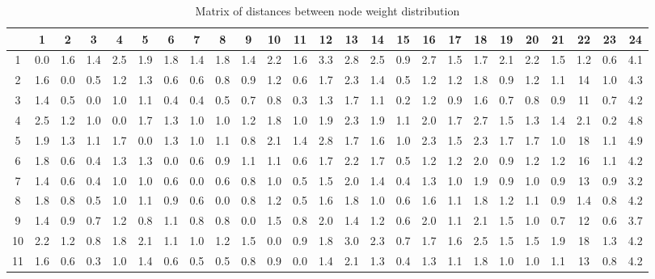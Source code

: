\begin{table}[htbp]
\footnotesize
\setlength{\tabcolsep}{3pt}
\caption{Matrix of distances between node weight distribution}
\label{Table:SpaceDistance}
\centering
\begin{tabular}{c|cccccccccccccccccccccccc}
\hline
& 1 & 2 & 3 & 4 & 5 & 6 & 7 & 8 & 9 & 10 & 11 & 12 & 13 & 14 & 15 & 16 & 17 & 18 & 19 & 20 & 21 & 22 & 23 & 24 \\
\hline
1 & 0.0 & 1.6 & 1.4 & 2.5 & 1.9 & 1.8 & 1.4 & 1.8 & 1.4 & 2.2 & 1.6 & 3.3 & 2.8 & 2.5 & 0.9 & 2.7 & 1.5 & 1.7 & 2.1 & 2.2 & 1.5 & 1.2 & 0.6 & 4.1 \\
2 & 1.6 & 0.0 & 0.5 & 1.2 & 1.3 & 0.6 & 0.6 & 0.8 & 0.9 & 1.2 & 0.6 & 1.7 & 2.3 & 1.4 & 0.5 & 1.2 & 1.2 & 1.8 & 0.9 & 1.2 & 1.1 & 14 & 1.0 & 4.3 \\
3 & 1.4 & 0.5 & 0.0 & 1.0 & 1.1 & 0.4 & 0.4 & 0.5 & 0.7 & 0.8 & 0.3 & 1.3 & 1.7 & 1.1 & 0.2 & 1.2 & 0.9 & 1.6 & 0.7 & 0.8 & 0.9 & 11 & 0.7 & 4.2 \\
4 & 2.5 & 1.2 & 1.0 & 0.0 & 1.7 & 1.3 & 1.0 & 1.0 & 1.2 & 1.8 & 1.0 & 1.9 & 2.3 & 1.9 & 1.1 & 2.0 & 1.7 & 2.7 & 1.5 & 1.3 & 1.4 & 2.1 & 0.2 & 4.8 \\
5 & 1.9 & 1.3 & 1.1 & 1.7 & 0.0 & 1.3 & 1.0 & 1.1 & 0.8 & 2.1 & 1.4 & 2.8 & 1.7 & 1.6 & 1.0 & 2.3 & 1.5 & 2.3 & 1.7 & 1.7 & 1.0 & 18 & 1.1 & 4.9 \\
6 & 1.8 & 0.6 & 0.4 & 1.3 & 1.3 & 0.0 & 0.6 & 0.9 & 1.1 & 1.1 & 0.6 & 1.7 & 2.2 & 1.7 & 0.5 & 1.2 & 1.2 & 2.0 & 0.9 & 1.2 & 1.2 & 16 & 1.1 & 4.2 \\
7 & 1.4 & 0.6 & 0.4 & 1.0 & 1.0 & 0.6 & 0.0 & 0.6 & 0.8 & 1.0 & 0.5 & 1.5 & 2.0 & 1.4 & 0.4 & 1.3 & 1.0 & 1.9 & 0.9 & 1.0 & 0.9 & 13 & 0.9 & 3.2 \\
8 & 1.8 & 0.8 & 0.5 & 1.0 & 1.1 & 0.9 & 0.6 & 0.0 & 0.8 & 1.2 & 0.5 & 1.6 & 1.8 & 1.0 & 0.6 & 1.6 & 1.1 & 1.8 & 1.2 & 1.1 & 0.9 & 1.4 & 0.8 & 4.2 \\
9 & 1.4 & 0.9 & 0.7 & 1.2 & 0.8 & 1.1 & 0.8 & 0.8 & 0.0 & 1.5 & 0.8 & 2.0 & 1.4 & 1.2 & 0.6 & 2.0 & 1.1 & 2.1 & 1.5 & 1.0 & 0.7 & 12 & 0.6 & 3.7 \\
10 & 2.2 & 1.2 & 0.8 & 1.8 & 2.1 & 1.1 & 1.0 & 1.2 & 1.5 & 0.0 & 0.9 & 1.8 & 3.0 & 2.3 & 0.7 & 1.7 & 1.6 & 2.5 & 1.5 & 1.5 & 1.9 & 18 & 1.3 & 4.2 \\
11 & 1.6 & 0.6 & 0.3 & 1.0 & 1.4 & 0.6 & 0.5 & 0.5 & 0.8 & 0.9 & 0.0 & 1.4 & 2.1 & 1.3 & 0.4 & 1.3 & 1.1 & 1.8 & 1.0 & 1.0 & 1.1 & 13 & 0.8 & 4.2 \\

\end{tabular}
\end{table}
